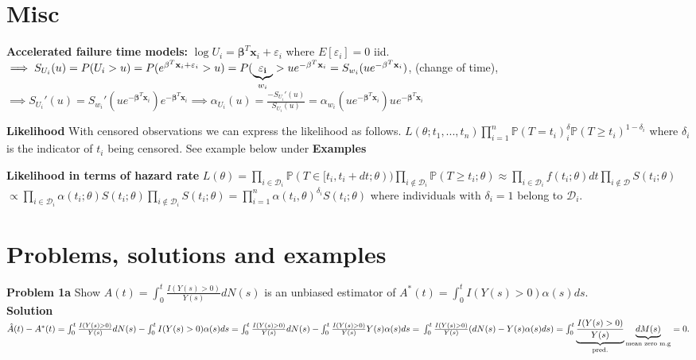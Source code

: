 \documentclass{article}
\begin{document}
\newpage

\section*{Misc}

\textbf{Accelerated failure time models:} $\log U_i = \mathbf{\beta}^T\mathbf{x}_i + \varepsilon_i$ where $E[\varepsilon_i]=0$ iid. $\implies S_{U_i}(u)=P(U_i>u)=P(e^{\mathbf{\beta}^T\mathbf{x}_i + \varepsilon_i}>u) = \\ P(\underbrace{\mathbf{\varepsilon_i}}_{w_i} > ue^{-\mathbf{\beta}^T\mathbf{x}_i} = S_{w_i}(ue^{-\mathbf{\beta}^T\mathbf{x}_i})$, (change of time), $\implies S_{U_i}'(u) = S_{w_i}'(ue^{-\mathbf{\beta}^T\mathbf{x}_i})e^{-\mathbf{\beta}^T\mathbf{x}_i} \implies \alpha_{U_i}(u) = \frac{-S_{U_i}'(u)}{S_{U_i}(u)} = \alpha_{w_i}(ue^{-\mathbf{\beta}^T\mathbf{x}_i})ue^{-\mathbf{\beta}^T\mathbf{x}_i}$

\medskip

\textbf{Likelihood} With censored observations we can express the likelihood as follows. $L(\theta; t_1,...,t_n)\prod_{i=1}^n \mathbb{P}(T = t_i)^\delta_i \mathbb{P}(T \geq t_i)^{1-\delta_i}$ where $\delta_i$ is the indicator of $t_i$ being censored. See example below under \textbf{Examples}

\medskip

\textbf{Likelihood in terms of hazard rate} $L(\theta) = \prod_{i\in \mathcal{D}_i}\mathbb{P}(T\in[t_i, t_i +dt;\theta))\prod_{i\notin \mathcal{D}_i}\mathbb{P}(T\geq t_i; \theta) \approx \prod_{i \in \mathcal{D}_i} f(t_i;\theta)dt\prod_{i \notin \mathcal{D}} S(t_i; \theta)$ \newline $\propto \prod_{i\in \mathcal{D}_i}\alpha(t_i;\theta)S(t_i;\theta)\prod_{i\notin \mathcal{D}_i}S(t_i;\theta) = \prod_{i=1}^n \alpha(t_i,\theta)^{\delta_i}S(t_i;\theta)$ where individuals with $\delta_i = 1$ belong to $\mathcal{D}_i$.

\medskip

\section*{Problems, solutions and examples} 

\textbf{Problem 1a} Show $\hat{A}(t) = \int_0^t \frac{I(Y(s)>0)}{Y(s)} dN(s)$ is an unbiased estimator of $A^*(t) = \int_0^t I(Y(s)>0)\alpha(s)ds$. \\
\textbf{Solution} $\hat{A}(t) - A^*(t)= \int_0^t \frac{I(Y(s)>0)}{Y(s)} dN(s) - \int_0^t I(Y(s)>0)\alpha(s)ds = \int_0^t \frac{I(Y(s)>0)}{Y(s)} dN(s) - \int_0^t \frac{I(Y(s)>0)}{Y(s)} Y(s)\alpha(s)ds = \\
\int_0^t \frac{I(Y(s)>0)}{Y(s)} (dN(s) - Y(s)\alpha(s)ds) =
\int_0^t \underbrace{\frac{I(Y(s)>0)}{Y(s)}}_{\text{pred.}} \underbrace{dM(s)}_{\text{mean zero m.g}} = 0.
$ 
\end{document}
